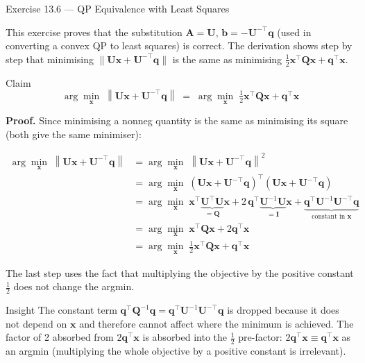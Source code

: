 \documentclass[aspectratio=169,10pt]{beamer}
\newcommand{\bx}{\mathbf{x}}
\newcommand{\bq}{\mathbf{q}}
\newcommand{\bb}{\mathbf{b}}
\newcommand{\bA}{\mathbf{A}}
\newcommand{\bQ}{\mathbf{Q}}
\newcommand{\bU}{\mathbf{U}}
\newcommand{\norm}[1]{\left\|#1\right\|}
\begin{document}
\begin{frame}[allowframebreaks]{Exercise 13.6 --- QP Equivalence with Least Squares}

  This exercise proves that the substitution $\bA = \bU$, $\bb = -\bU^{-\top}\bq$
  (used in converting a convex QP to least squares) is correct.  The derivation
  shows step by step that minimising $\|\bU\bx + \bU^{-\top}\bq\|$ is the same as
  minimising $\tfrac{1}{2}\bx^{\top}\bQ\bx + \bq^{\top}\bx$.

  \begin{block}{Claim}
    \[
      \arg\min_{\bx}\;\norm{\bU\bx + \bU^{-\top}\bq}
      \;=\;
      \arg\min_{\bx}\;\tfrac{1}{2}\bx^{\top}\bQ\bx + \bq^{\top}\bx
    \]
  \end{block}

  \textbf{Proof.}  Since minimising a nonneg quantity is the same as minimising
  its square (both give the same minimiser):

  \begin{align*}
    \arg\min_{\bx}\;\norm{\bU\bx + \bU^{-\top}\bq}
    &= \arg\min_{\bx}\;\norm{\bU\bx + \bU^{-\top}\bq}^2\\
    &= \arg\min_{\bx}\;
      (\bU\bx + \bU^{-\top}\bq)^{\top}(\bU\bx + \bU^{-\top}\bq)\\
    &= \arg\min_{\bx}\;
      \bx^{\top}\underbrace{\bU^{\top}\bU}_{=\bQ}\bx
      + 2\,\bq^{\top}\underbrace{\bU^{-1}\bU}_{=\mathbf{I}}\bx
      + \underbrace{\bq^{\top}\bU^{-1}\bU^{-\top}\bq}_{\text{constant in }\bx}\\
    &= \arg\min_{\bx}\;\bx^{\top}\bQ\bx + 2\bq^{\top}\bx\\
    &= \arg\min_{\bx}\;\tfrac{1}{2}\bx^{\top}\bQ\bx + \bq^{\top}\bx
  \end{align*}

  The last step uses the fact that multiplying the objective by the positive constant
  $\tfrac{1}{2}$ does not change the argmin.

  \begin{alertblock}{Insight}
    The constant term $\bq^{\top}\bQ^{-1}\bq = \bq^{\top}\bU^{-1}\bU^{-\top}\bq$
    is dropped because it does not depend on $\bx$ and therefore cannot affect
    where the minimum is achieved.  The factor of 2 absorbed from $2\bq^{\top}\bx$
    is absorbed into the $\tfrac{1}{2}$ pre-factor: $2\bq^{\top}\bx \equiv \bq^{\top}\bx$
    as an argmin (multiplying the whole objective by a positive constant is irrelevant).
  \end{alertblock}

\end{frame}
\end{document}
